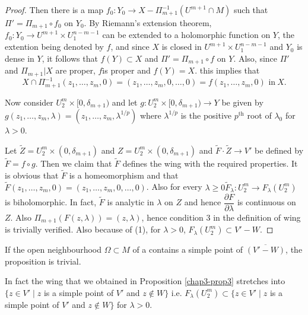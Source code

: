 \begin{proof}
Then there is a map $f_{0}:Y_{0}\to X-\Pi^{-1}_{m+1}(U^{m+1}\cap M)$
such that $\Pi'=\Pi_{m+1}\circ f_{0}$ on $Y_{0}$. By Riemann's
extension theorem, $f_{0}:Y_{0}\to U^{m+1}\times U^{n-m-1}_{1}$ can be
extended to a holomorphic function on $Y$, the extention being denoted
by $f$, and since $X$ is closed in $U^{m+1}\times U^{n-m-1}_{1}$ and
$Y_{0}$ is dense in $Y$, it follows that $f(Y)\subset X$ and
$\Pi'=\Pi_{m+1}\circ f$ on $Y$. Also, since $\Pi'$ and $\Pi_{m+1}|X$
are proper, $f$\pageoriginale is proper and $f(Y)=X$. this implies
that
$$
X\cap
\Pi^{-1}_{m+1}(z_{1},\ldots,z_{m},0)=(z_{1},\ldots,z_{m},0,\ldots,0)=f(z_{1},\ldots,z_{m},0)\text{~in}~X.
$$

Now consider $U^{m}_{2}\times [0,\delta_{m+1})$ and let
  $g:U^{m}_{2}\times[0,\delta_{m+1})\to Y$ be given by
    $g(z_{1},\ldots,z_{m},\lambda)=(z_{1},\ldots,z_{m},\lambda^{1/p})$
    where $\lambda^{1/p}$ is the positive $p^{\text{th}}$ root of
    $\lambda_{0}$ for $\lambda>0$.

Let $\widetilde{Z}=U^m_2 \times (0, \delta_{m+1})$ and $Z = U^m_2 \times
(0, \delta_{m+1})$ and $\widetilde{F}\cdot\widetilde{Z}\to V'$ be
defined by $\widetilde{F}= f \circ  g$. Then we claim that $\widetilde{F}$
defines the wing with the required properties. It is obvious that
$\widetilde{F}$ is a homeomorphism and that $\widetilde{F}(z_1,\ldots,z_m,0) =
(z_1,\ldots,z_m, 0,\ldots,0)$. Also for every $\lambda \geq 0
\widetilde{F}_{\lambda}: U^m_2 \to F_\lambda (U^m_2)$ is
biholomorphic. In fact, $\widetilde{F}$ is analytic in $\lambda$ on $Z$
and hence $\dfrac{\partial F}{\partial \lambda}$ is continuous on
$Z$. Also $\Pi_{m+1} (F(z,\lambda)) = (z,\lambda)$, hence condition 3
in the definition of wing is trivially verified. Also because of 
(1), for $\lambda > 0$, $F_\lambda (U^m_2) \subset V' - W$. 
\end{proof}

\begin{remark}\label{chap3-rem9} %
  If the open neighbourhood $\Omega \subset M$ of a contains a simple
  point of $\overline{(V'-W)}$, the proposition is trivial.  
\end{remark}

\begin{remark}\label{chap3-rem10} %
  In fact the wing that we obtained in Proposition \ref{chap3-prop3}
  stretches into 
  $\bigg\{ z \in V' \mid z$ is a simple point of $V'$ and $z
  \notin W \bigg\}$ i.e. $F_\lambda (U^m_2) \subset \{ z\in
  V'\mid z$ is a simple point of $V'$ and $z\notin W\}$ for
  $\lambda > 0$. 
\end{remark}


